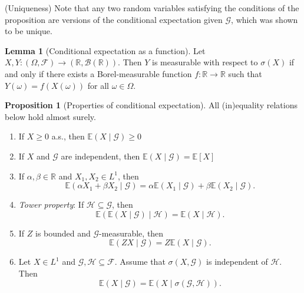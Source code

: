 \documentclass[parskip=full]{article}
\theoremstyle{definition}
\newtheorem{proposition}{Proposition}[section]
\newtheorem{lemma}{Lemma}[proposition]
\newcommand{\R}{\mathbb{R}}
\newcommand{\F}{\mathcal{F}}
\newcommand{\B}{\mathcal{B}}
\newcommand{\1}{\mathbbm{1}}
\newcommand{\E}{\mathbb{E}}
\begin{document}
(Uniqueness) Note that any two random variables satisfying the conditions of the proposition are versions of the conditional expectation given $\mathcal{G}$, which was shown to be unique.

\begin{lemma}[Conditional expectation as a function]
  Let $X, Y: (\Omega, \F) \to (\R, \B(\R))$. Then $Y$ is measurable with respect to $\sigma(X)$ if and only if there exists a Borel-measurable function $f: \R \to \R$ such that $Y(\omega) = f(X(\omega))$ for all $\omega \in \Omega$.
\end{lemma}


\begin{proposition}[Properties of conditional expectation]
  All (in)equality relations below hold almost surely.
  \begin{enumerate}
    \item If $X \geq 0$ a.s., then $\E(X \mid \mathcal{G}) \geq 0$
    \item If $X$ and $\mathcal{G}$ are independent, then $\E(X \mid \mathcal{G}) = \E[X]$
    \item If $\alpha, \beta \in \R$ and $X_1, X_2 \in L^1$, then
          \[
            \E(\alpha X_1 + \beta X_2 \mid \mathcal{G}) = \alpha \E(X_1 \mid\mathcal{G}) + \beta \E(X_2 \mid \mathcal{G}).
          \]
    \item \emph{Tower property}: If $\mathcal{H} \subseteq \mathcal{G}$, then
          \[
            \E(\E(X \mid \mathcal{G}) \mid \mathcal{H}) = \E(X \mid \mathcal{H}).
          \]
    \item If $Z$ is bounded and $\mathcal{G}$-measurable, then
          \[
            \E(ZX \mid \mathcal{G}) = Z \E(X \mid \mathcal{G}).
          \]
    \item Let $X \in L^1$ and $\mathcal{G}, \mathcal{H} \subseteq \mathcal{F}$. Assume that $\sigma(X, \mathcal{G})$ is independent of $\mathcal{H}$. Then
          \[
            \E (X \mid \mathcal{G}) = \E(X \mid \sigma(\mathcal{G}, \mathcal{H})).
          \]
  \end{enumerate}
\end{proposition}
\end{document}
